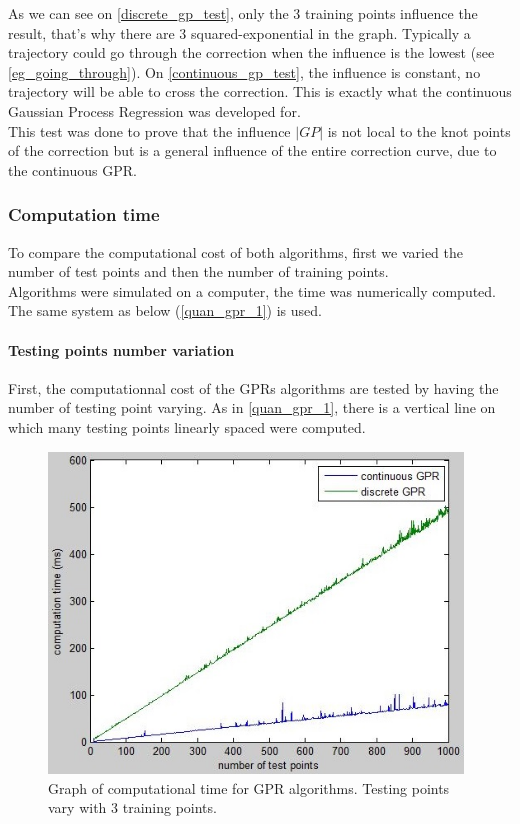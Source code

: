 As we can see on \autoref{discrete_gp_test}, only the 3 training points influence the result, that's why there are 3 squared-exponential in the graph. Typically a trajectory could go through the correction when the influence is the lowest (see \autoref{eg_going_through}).
On \autoref{continuous_gp_test}, the influence is constant, no trajectory will be able to cross the correction. This is exactly what the continuous Gaussian Process Regression was developed for.\\

This test was done to prove that the influence $|GP|$ is not local to the knot points of the correction but is a general influence of the entire correction curve, due to the continuous GPR.

\subsubsection{Computation time}

To compare the computational cost of both algorithms, first we varied the number of test points and then the number of training points.\\
Algorithms were simulated on a computer, the time was numerically computed. The same system as below (\autoref{quan_gpr_1}) is used.

\paragraph*{Testing points number variation}

First, the computationnal cost of the GPRs algorithms are tested by having the number of testing point varying. As in \autoref{quan_gpr_1}, there is a vertical line on which many testing points linearly spaced were computed.

\begin{figure}[H]
\centering
\includegraphics[width=11cm]{img/analysis_time_both.jpg}
\caption{Graph of computational time for GPR algorithms. Testing points vary with 3 training points.}
\label{booooom_explosion!}
\end{figure}

